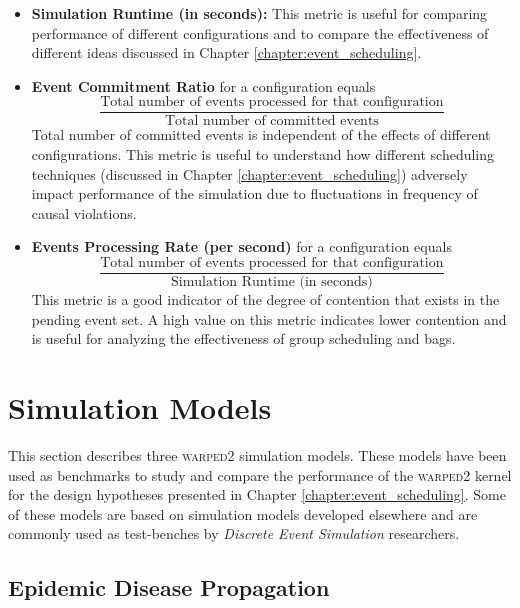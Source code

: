 \documentclass[11pt]{book}
\begin{document}
\begin{itemize}

\item \textbf{Simulation Runtime (in seconds):}  This metric is useful for comparing performance of
  different configurations and to compare the effectiveness of different ideas discussed in Chapter
  \ref{chapter:event_scheduling}.

\item \textbf{Event Commitment Ratio} for a configuration equals
  \begin{equation*}
    \frac{\text{Total number of events processed for that configuration}} {\text{Total number of
        committed events}}
  \end{equation*}
  \noindent
  Total number of committed events is independent of the effects of different configurations.  This metric is
  useful to understand how different scheduling techniques (discussed in Chapter
  \ref{chapter:event_scheduling}) adversely impact performance of the simulation due to fluctuations in
  frequency of causal violations.

\item \textbf{Events Processing Rate (per second)} for a configuration equals
  \begin{equation*}
    \frac{\text{Total number of events processed for that configuration}} {\text{Simulation Runtime
        (in seconds)}}
  \end{equation*}
  \noindent
  This metric is a good indicator of the degree of contention that exists in the pending event set. A high
  value on this metric indicates lower contention and is useful for analyzing the effectiveness of group
  scheduling and bags.
\end{itemize}

\section[Benchmarks]{Simulation Models}\label{sec:simulation_models}

This section describes three \textsc{warped2} simulation models.  These models have been used as benchmarks to
study and compare the performance of the \textsc{warped2} kernel for the design hypotheses presented in
Chapter \ref{chapter:event_scheduling}.  Some of these models are based on simulation models developed
elsewhere and are commonly used as test-benches by \emph{Discrete Event Simulation} researchers.

\subsection{Epidemic Disease Propagation}\label{subsec:epidemic}
\end{document}
